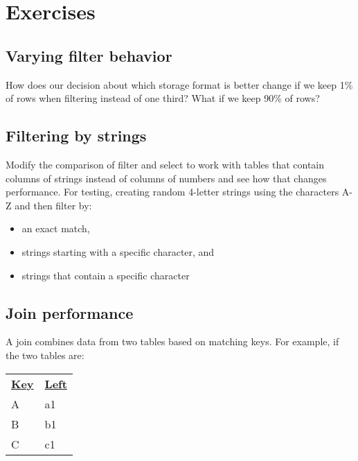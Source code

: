 \documentclass[krantzl]{krantz}
\begin{document}
\section{Exercises}\label{data-table-exercises}

\subsection*{Varying filter behavior}


How does our decision about which storage format is better change
if we keep 1\% of rows when filtering instead of one third?
What if we keep 90\% of rows?

\subsection*{Filtering by strings}


Modify the comparison of filter and select to work with tables
that contain columns of strings instead of columns of numbers
and see how that changes performance.
For testing,
creating random 4-letter strings using the characters A-Z
and then filter by:

\begin{itemize}

\item an exact match,

\item strings starting with a specific character, and

\item strings that contain a specific character

\end{itemize}

\subsection*{Join performance}


A join combines data from two tables based on matching keys.
For example,
if the two tables are:


\vspace{\baselineskip}
\begin{tabular}{ll}
\textbf{\underline{Key}} & \textbf{\underline{Left}} \\
A & a1 \\
B & b1 \\
C & c1 \\
\end{tabular}
\end{document}
